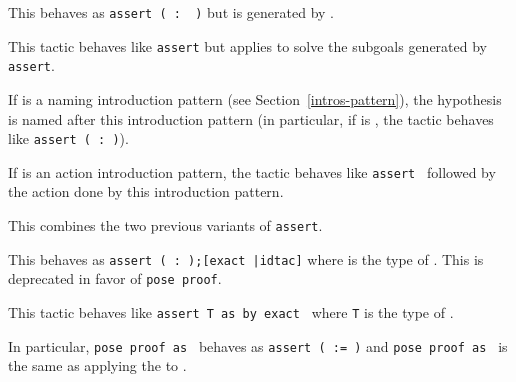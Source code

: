 \begin{Variants}

\item{}

  This behaves as {\tt assert ( {\ident} :\ {\form} )} but
  {\ident} is generated by {\Coq}.

\item {}

  This tactic behaves like \texttt{assert} but applies {\tac}
  to solve the subgoals generated by \texttt{assert}.

  \ErrMsg {}

\item {}

  If {\intropattern} is a naming introduction pattern (see
  Section~\ref{intros-pattern}), the hypothesis is named after this
  introduction pattern (in particular, if {\intropattern} is {\ident},
  the tactic behaves like \texttt{assert ({\ident} :\ {\form})}).

  If {\intropattern} is an action introduction pattern, the tactic
  behaves like \texttt{assert {\form}} followed by the action done by
  this introduction pattern.

\item {}

  This combines the two previous variants of {\tt assert}.

\item{}

  This behaves as {\tt assert ({\ident} :\ {\type});[exact
      {\term}|idtac]} where {\type} is the type of {\term}. This is
  deprecated in favor of {\tt pose proof}.

  \ErrMsg {}

\item {}

  This tactic behaves like \texttt{assert T as {\intropattern} by
  exact {\term}} where \texttt{T} is the type of {\term}.

  In particular, \texttt{pose proof {\term} as {\ident}} behaves as
  \texttt{assert ({\ident} := {\term})} and \texttt{pose proof {\term}
    as {\intropattern}} is the same as applying
  the {\intropattern} to {\term}.


\end{Variants}
